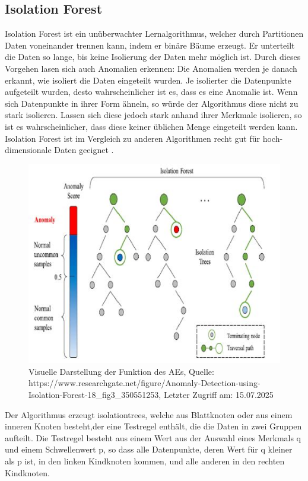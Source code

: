 \documentclass[a4paper,12pt]{article}
\begin{document}
	\subsection{Isolation Forest}
	Isolation Forest ist ein unüberwachter Lernalgorithmus, welcher durch Partitionen Daten voneinander trennen kann, indem er binäre Bäume erzeugt. Er unterteilt die Daten so lange, bis keine Isolierung der Daten mehr möglich ist. Durch dieses Vorgehen lasen sich auch Anomalien erkennen: Die Anomalien werden je danach erkannt, wie isoliert die Daten eingeteilt wurden. Je isolierter die Datenpunkte aufgeteilt wurden, desto wahrscheinlicher ist es, dass es eine Anomalie ist. Wenn sich Datenpunkte in ihrer Form ähneln, so würde der Algorithmus diese nicht zu stark isolieren. Lassen sich diese jedoch stark anhand ihrer Merkmale isolieren, so  ist es wahrscheinlicher, dass diese keiner üblichen Menge eingeteilt werden kann. Isolation Forest ist im Vergleich zu anderen Algorithmen recht gut für hoch-dimensionale Daten geeignet \cite{liu2008isolation}.
	\\[0.5em]
	\begin{figure}
		\centering
		\includegraphics[width=0.7\linewidth]{Bilder/screenshot005}
		\caption{Visuelle Darstellung der Funktion des AEs, Quelle: https://www.researchgate.net/figure/Anomaly-Detection-using-Isolation-Forest-18\_fig3\_350551253, Letzter Zugriff am: 15.07.2025}
		\label{fig:screenshot005}
	\end{figure}
	Der Algorithmus erzeugt \gls{isolationtree}s, welche aus Blattknoten oder aus einem inneren Knoten besteht,der eine Testregel enthält, die die Daten in zwei Gruppen aufteilt. Die Testregel besteht aus einem Wert aus der Auswahl eines Merkmals  q und einem Schwellenwert p, so dass alle Datenpunkte, deren Wert für q kleiner als p ist, in den linken Kindknoten kommen, und alle anderen in den rechten Kindknoten.
\end{document}
